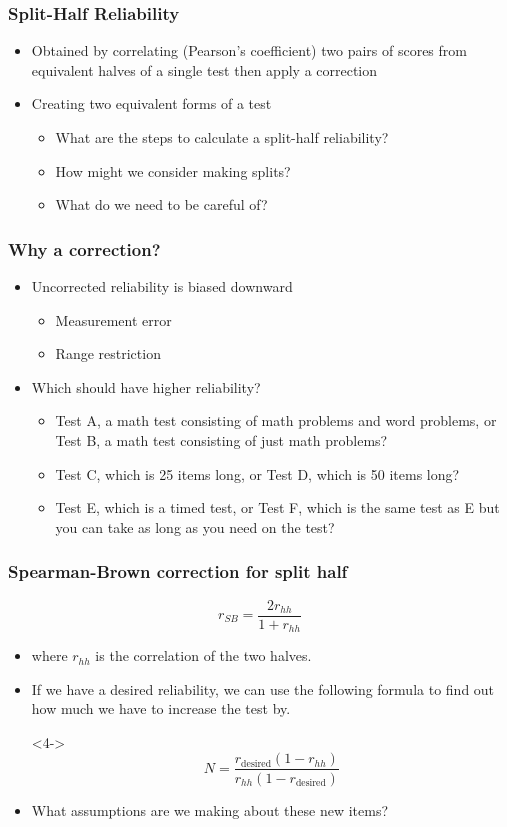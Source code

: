 \documentclass[dvipsnames]{beamer}\usepackage[]{graphicx}\usepackage[]{color}
\begin{document}
\begin{frame}
  \frametitle{Split-Half Reliability}
  \begin{itemize}
    \item Obtained by correlating (Pearson's coefficient) two pairs of scores from equivalent halves of a single test then apply a correction
    \item Creating two equivalent forms of a test
    \begin{itemize}
    \item \textcolor{wapurple}{What are the steps to calculate a split-half reliability?}
    \item \textcolor{wapurple}{How might we consider making splits?}
    \item \textcolor{wapurple}{What do we need to be careful of?}
    \end{itemize}
  \end{itemize}
\end{frame}

\begin{frame}
  \frametitle{Why a correction?}
  \begin{itemize}
    \item<1-> \textcolor{wared}{Uncorrected reliability is biased downward}
    \begin{itemize}
      \item<2-> Measurement error
      \item<2-> Range restriction
    \end{itemize}
    \item<3-> \textcolor{wared}{Which should have higher reliability?}
      \begin{itemize}
        \item Test A, a math test consisting of math problems and word problems, or Test B, a math test consisting of just math problems?
        \item Test C, which is 25 items long, or Test D, which is 50 items long?
        \item Test E, which is a timed test, or Test F, which is the same test as E but you can take as long as you need on the test?
      \end{itemize}
    \end{itemize}
\end{frame}

\begin{frame}
  \frametitle{Spearman-Brown correction for split half}
  $$r_{SB} = \frac{2r_{hh}}{1 + r_{hh}}$$
  \begin{itemize}
    \item<2-> where $r_{hh}$ is the correlation of the two halves.
    \item<3-> If we have a desired reliability, we can use the following formula to find out how much we have to increase the test by.
    \item[]<4->$$N = \frac{r_{\text{desired}}(1 - r_{hh})}{r_{hh}(1 - r_{\text{desired}})}$$
    \item<5-> What assumptions are we making about these new items?
  \end{itemize}
\end{frame}
\end{document}
